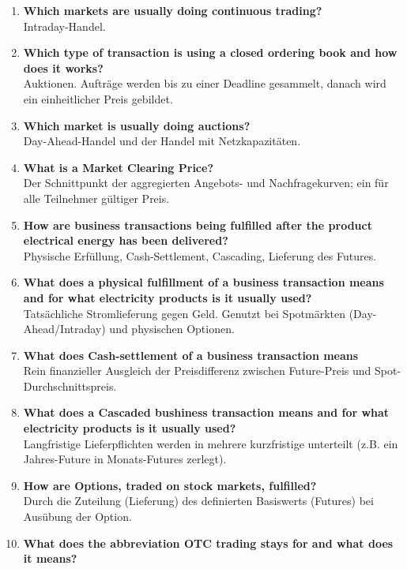 \documentclass{article}
\begin{document}
\begin{enumerate}
    Kontinuierlicher Handel. Kauf- und Verkaufsaufträge werden gesammelt und fortlaufend abgeglichen.
    \item \textbf{Which markets are usually doing continuous trading?} \\
    Intraday-Handel.
    \item \textbf{Which type of transaction is using a closed ordering book and how does it works?} \\
    Auktionen. Aufträge werden bis zu einer Deadline gesammelt, danach wird ein einheitlicher Preis gebildet.
    \item \textbf{Which market is usually doing auctions?} \\
    Day-Ahead-Handel und der Handel mit Netzkapazitäten.
    \item \textbf{What is a Market Clearing Price?} \\
    Der Schnittpunkt der aggregierten Angebots- und Nachfragekurven; ein für alle Teilnehmer gültiger Preis.
    \item \textbf{How are business transactions being fulfilled after the product electrical energy has been delivered?} \\
    Physische Erfüllung, Cash-Settlement, Cascading, Lieferung des Futures.
    \item \textbf{What does a physical fulfillment of a business transaction means and for what electricity products is it usually used?} \\
    Tatsächliche Stromlieferung gegen Geld. Genutzt bei Spotmärkten (Day-Ahead/Intraday) und physischen Optionen.
    \item \textbf{What does Cash-settlement of a business transaction means} \\
    Rein finanzieller Ausgleich der Preisdifferenz zwischen Future-Preis und Spot-Durchschnittspreis.
    \item \textbf{What does a Cascaded bushiness transaction means and for what electricity products is it usually used?} \\
    Langfristige Lieferpflichten werden in mehrere kurzfristige unterteilt (z.B. ein Jahres-Future in Monats-Futures zerlegt).
    \item \textbf{How are Options, traded on stock markets, fulfilled?} \\
    Durch die Zuteilung (Lieferung) des definierten Basiswerts (Futures) bei Ausübung der Option.
    \item \textbf{What does the abbreviation OTC trading stays for and what does it means?} \\

\end{enumerate}
\end{document}
